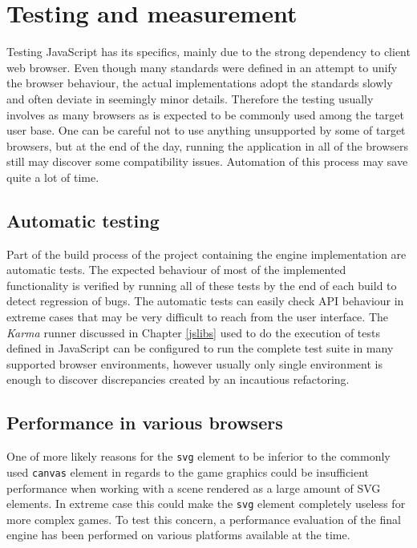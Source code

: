 \documentclass[11pt,oneside, final]{fithesis2}
\begin{document}
\chapter{Testing and measurement}
\label{testing}
Testing JavaScript has its specifics, mainly due to the strong dependency to client web browser. Even though many standards were defined in an attempt to unify the browser behaviour, the actual implementations adopt the standards slowly and often deviate in seemingly minor details. Therefore the testing usually involves as many browsers as is expected to be commonly used among the target user base. One can be careful not to use anything unsupported by some of target browsers, but at the end of the day, running the application in all of the browsers still may discover some compatibility issues. Automation of this process may save quite a lot of time. 

\section{Automatic testing}
Part of the build process of the project containing the engine implementation are automatic tests. The expected behaviour of most of the implemented functionality is verified by running all of these tests by the end of each build to detect regression of bugs. The automatic tests can easily check API behaviour in extreme cases that may be very difficult to reach from the user interface. The \emph{Karma} runner discussed in Chapter \ref{jslibs} used to do the execution of tests defined in JavaScript can be configured to run the complete test suite in many supported browser environments, however usually only single environment is enough to discover discrepancies created by an incautious refactoring. 

\section{Performance in various browsers}
One of more likely reasons for the \texttt{svg} element to be inferior to the commonly used \texttt{canvas} element in regards to the game graphics could be insufficient performance when working with a scene rendered as a large amount of SVG elements. In extreme case this could make the \texttt{svg} element completely useless for more complex games. To test this concern, a performance evaluation of the final engine has been performed on various platforms available at the time.
\end{document}
